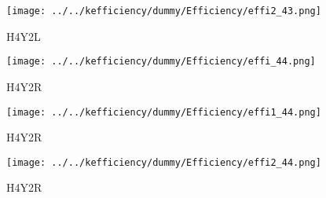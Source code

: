\documentclass[10pt, xcolor={dvipsnames}, aspectratio = 169]{beamer}
\begin{document}
\begin{frame}

\begin{figure}
\centering
\texttt{[image: ../../kefficiency/dummy/Efficiency/effi2\_43.png]}
\caption{H4Y2L}
\end{figure}

\end{frame}

\begin{frame}

\begin{figure}
\centering
\texttt{[image: ../../kefficiency/dummy/Efficiency/effi\_44.png]}
\caption{H4Y2R}
\end{figure}

\end{frame}

\begin{frame}

\begin{figure}
\centering
\texttt{[image: ../../kefficiency/dummy/Efficiency/effi1\_44.png]}
\caption{H4Y2R}
\end{figure}

\end{frame}

\begin{frame}

\begin{figure}
\centering
\texttt{[image: ../../kefficiency/dummy/Efficiency/effi2\_44.png]}
\caption{H4Y2R}
\end{figure}

\end{frame}
\end{document}
